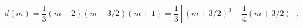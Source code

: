 \begin{equation}
d(m)=\frac{1}{3}(m+2)(m+3/2)(m+1)=
\frac{1}{3}\left[(m+3/2)^3-\frac{1}{4}(m+3/2)\right],
\label{deg}
\end{equation}

